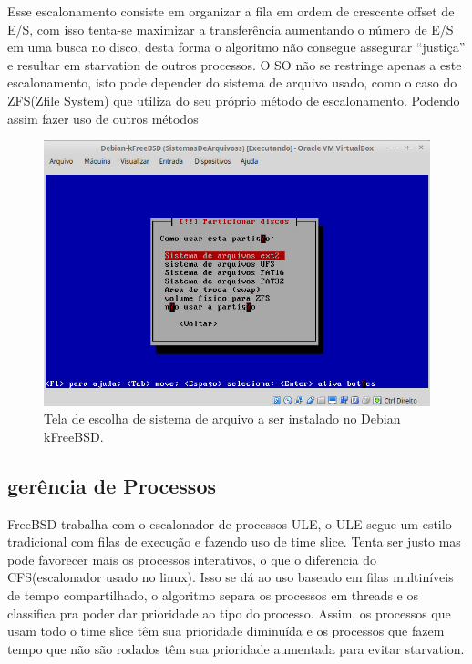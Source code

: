 \documentclass[conference]{IEEEtran}
\begin{document}
Esse escalonamento consiste em organizar a fila em ordem de crescente offset de E/S, com isso tenta-se maximizar a transferência aumentando o número de E/S em uma busca no disco, desta forma o algoritmo não consegue assegurar “justiça” e resultar em starvation de outros processos. 
O SO não se restringe apenas a este escalonamento, isto pode depender do sistema de arquivo usado, como o caso do ZFS(Zfile System) que utiliza do seu próprio método de escalonamento. Podendo assim fazer uso de outros métodos \\
\begin{figure}[h!]
	\centering
	\includegraphics[scale=0.34]{SistemasArquivoskFreeBSD.jpeg}
	\caption{Tela de escolha de sistema de arquivo a ser instalado no Debian kFreeBSD.}
	\label{fig:SisAqrLinux}
\end{figure}
\subsection{gerência de Processos}\label{sec:BSDPROC}
FreeBSD trabalha com o escalonador de processos ULE, o ULE segue um estilo tradicional com filas de execução e fazendo uso de time slice. Tenta ser justo mas pode favorecer mais os processos interativos, o que o diferencia do CFS(escalonador usado no linux). Isso se dá ao uso baseado em filas multiníveis de tempo compartilhado, o algoritmo  separa os processos em threads e os classifica pra poder dar prioridade ao tipo do processo. Assim, os processos que usam todo o time slice têm sua prioridade diminuída e os processos que fazem tempo que não são rodados têm sua prioridade aumentada para evitar starvation.\\
\end{document}
